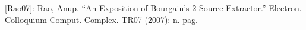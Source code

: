 [Rao07]: Rao, Anup. “An Exposition of Bourgain's 2-Source Extractor.” Electron. Colloquium Comput. Complex. TR07 (2007): n. pag.

%















